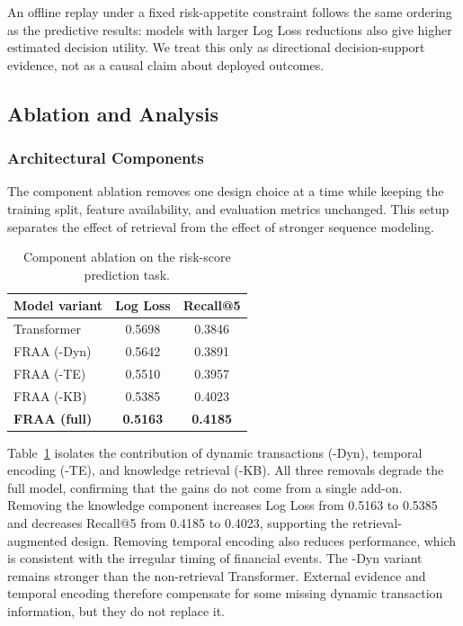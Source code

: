\documentclass[runningheads]{llncs}
\newcommand{\best}[1]{\textbf{#1}}
\begin{document}
An offline replay under a fixed risk-appetite constraint follows the same ordering as the predictive results: models with larger Log Loss reductions also give higher estimated decision utility. We treat this only as directional decision-support evidence, not as a causal claim about deployed outcomes.

\subsection{Ablation and Analysis}
\label{sec:ablation}

\subsubsection{Architectural Components}
The component ablation removes one design choice at a time while keeping the training split, feature availability, and evaluation metrics unchanged. This setup separates the effect of retrieval from the effect of stronger sequence modeling.

\begin{table}[H]
\centering
\caption{Component ablation on the risk-score prediction task.}
\label{tab:component_ablation}
\begin{tabular}{lcc}
\toprule
\textbf{Model variant} & \textbf{Log Loss} & \textbf{Recall@5} \\
\midrule
Transformer & 0.5698 & 0.3846 \\
\rowcolor{tablerowalt}
FRAA (-Dyn) & 0.5642 & 0.3891 \\
FRAA (-TE) & 0.5510 & 0.3957 \\
\rowcolor{tablerowalt}
FRAA (-KB) & 0.5385 & 0.4023 \\
\textbf{FRAA (full)} & \best{0.5163} & \best{0.4185} \\
\bottomrule
\end{tabular}
\end{table}

Table~\ref{tab:component_ablation} isolates the contribution of dynamic transactions (-Dyn), temporal encoding (-TE), and knowledge retrieval (-KB). All three removals degrade the full model, confirming that the gains do not come from a single add-on. Removing the knowledge component increases Log Loss from 0.5163 to 0.5385 and decreases Recall@5 from 0.4185 to 0.4023, supporting the retrieval-augmented design. Removing temporal encoding also reduces performance, which is consistent with the irregular timing of financial events. The -Dyn variant remains stronger than the non-retrieval Transformer. External evidence and temporal encoding therefore compensate for some missing dynamic transaction information, but they do not replace it.
\end{document}
